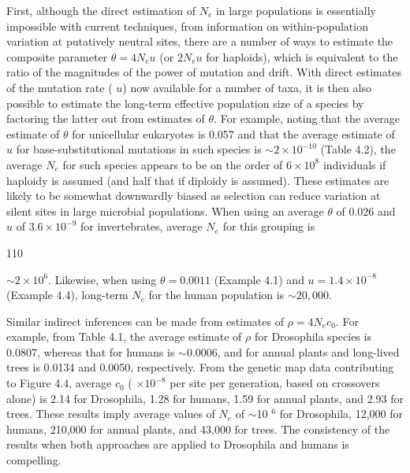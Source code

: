 \documentclass{article}
\begin{document}
First, although the direct estimation of  $ N_e $ in large populations is essentially impossible with current techniques, from information on within-population variation at putatively neutral sites, there are a number of ways to estimate the composite parameter  $ \theta = 4N_e u $ (or  $ 2N_e u $ for haploids), which is equivalent to the ratio of the magnitudes of the power of mutation and drift. With direct estimates of the mutation rate ( $ u $) now available for a number of taxa, it is then also possible to estimate the long-term effective population size of a species by factoring the latter out from estimates of  $ \theta $. For example, noting that the average estimate of  $ \theta $ for unicellular eukaryotes is 0.057 and that the average estimate of  $ u $ for base-substitutional mutations in such species is  $ \sim 2 \times 10^{-10} $ (Table 4.2), the average  $ N_e $ for such species appears to be on the order of  $ 6 \times 10^8 $ individuals if haploidy is assumed (and half that if diploidy is assumed). These estimates are likely to be somewhat downwardly biased as selection can reduce variation at silent sites in large microbial populations. When using an average  $ \theta $ of 0.026 and  $ u $ of  $ 3.6 \times 10^{-9} $ for invertebrates, average  $ N_e $ for this grouping is

110

$\sim2\times10^{6}$. Likewise, when using $\theta=0.0011$ (Example 4.1) and $u=1.4\times10^{-8}$ (Example 4.4), long-term $N_{e}$ for the human population is $\sim20,000$.

Similar indirect inferences can be made from estimates of  $ \rho = 4N_e c_0 $. For example, from Table 4.1, the average estimate of  $ \rho $ for Drosophila species is 0.0807, whereas that for humans is  $ \sim $0.0006, and for annual plants and long-lived trees is 0.0134 and 0.0050, respectively. From the genetic map data contributing to Figure 4.4, average  $ c_0 $ ( $ \times 10^{-8} $ per site per generation, based on crossovers alone) is 2.14 for Drosophila, 1.28 for humans, 1.59 for annual plants, and 2.93 for trees. These results imply average values of  $ N_e $ of  $ \sim $10 $ ^6 $ for Drosophila, 12,000 for humans, 210,000 for annual plants, and 43,000 for trees. The consistency of the results when both approaches are applied to Drosophila and humans is compelling.
\end{document}
